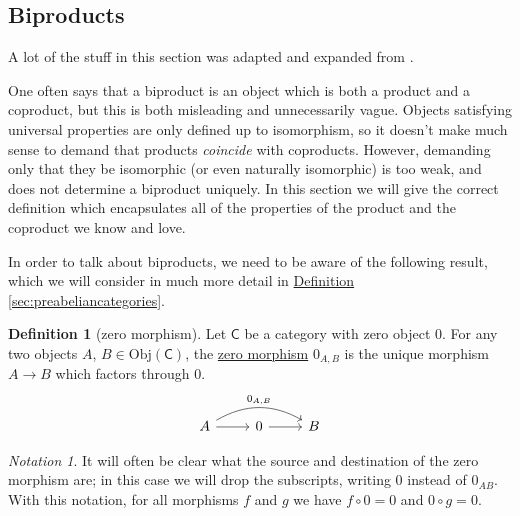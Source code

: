 \documentclass[a4paper]{report}
\newcommand{\defn}[1]{\ul{#1}}
\newcommand{\Obj}{\mathrm{Obj}}
\theoremstyle{definition}
\newtheorem{definition}{Definition}[section]
\theoremstyle{plain}
\theoremstyle{remark}
\newtheorem{notation}{Notation}[section]
\begin{document}
\subsection{Biproducts} \label{sec:biproducts}
A lot of the stuff in this section was adapted and expanded from \cite{annoying-precision-meditation}.

One often says that a biproduct is an object which is both a product and a coproduct, but this is both misleading and unnecessarily vague. Objects satisfying universal properties are only defined up to isomorphism, so it doesn't make much sense to demand that products \emph{coincide} with coproducts. However, demanding only that they be isomorphic (or even naturally isomorphic) is too weak, and does not determine a biproduct uniquely. In this section we will give the correct definition which encapsulates all of the properties of the product and the coproduct we know and love.

In order to talk about biproducts, we need to be aware of the following result, which we will consider in much more detail in \hyperref[sec:preabeliancategories]{Definition \ref*{sec:preabeliancategories}}.

\begin{definition}[zero morphism]
  Let $\mathsf{C}$ be a category with zero object $0$. For any two objects $A$, $B \in \Obj(\mathsf{C})$, the \defn{zero morphism} $0_{A,B}$ is the unique morphism $A \to B$ which factors through $0$.
  \begin{equation*}
    \begin{tikzcd}
      A
      \arrow[rr, bend left, "0_{A, B}"]
      \arrow[r]
      & 0
      \arrow[r]
      & B
    \end{tikzcd}
  \end{equation*}
\end{definition}

\begin{notation}
  It will often be clear what the source and destination of the zero morphism are; in this case we will drop the subscripts, writing $0$ instead of $0_{AB}$. With this notation, for all morphisms $f$ and $g$ we have $f \circ 0 = 0$ and $0 \circ g = 0$.
\end{notation}
\end{document}
